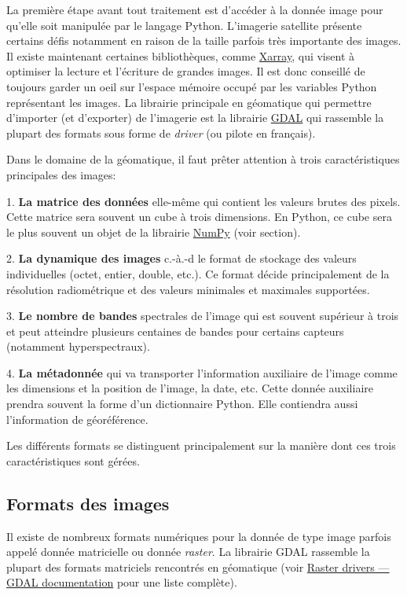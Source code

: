 \documentclass[
  11pt,
  letterpaper,
  open=any,
  twoside=false,
  french]{scrbook}
\begin{document}
La première étape avant tout traitement est d'accéder à la donnée image
pour qu'elle soit manipulée par le langage Python. L'imagerie satellite
présente certains défis notamment en raison de la taille parfois très
importante des images. Il existe maintenant certaines bibliothèques,
comme \href{https://docs.xarray.dev/en/stable/}{Xarray}, qui visent à
optimiser la lecture et l'écriture de grandes images. Il est donc
conseillé de toujours garder un oeil sur l'espace mémoire occupé par les
variables Python représentant les images. La librairie principale en
géomatique qui permettre d'importer (et d'exporter) de l'imagerie est la
librairie \href{https://gdal.org}{GDAL} qui rassemble la plupart des
formats sous forme de \emph{driver} (ou pilote en français).

Dans le domaine de la géomatique, il faut prêter attention à trois
caractéristiques principales des images:

1. \textbf{La matrice des données} elle-même qui contient les valeurs
brutes des pixels. Cette matrice sera souvent un cube à trois
dimensions. En Python, ce cube sera le plus souvent un objet de la
librairie \href{https://numpy.org/}{NumPy} (voir section).

2. \textbf{La dynamique des images} c.-à.-d le format de stockage des
valeurs individuelles (octet, entier, double, etc.). Ce format décide
principalement de la résolution radiométrique et des valeurs minimales
et maximales supportées.

3. \textbf{Le nombre de bandes} spectrales de l'image qui est souvent
supérieur à trois et peut atteindre plusieurs centaines de bandes pour
certains capteurs (notamment hyperspectraux).

4. \textbf{La métadonnée} qui va transporter l'information auxiliaire de
l'image comme les dimensions et la position de l'image, la date, etc.
Cette donnée auxiliaire prendra souvent la forme d'un dictionnaire
Python. Elle contiendra aussi l'information de géoréférence.

Les différents formats se distinguent principalement sur la manière dont
ces trois caractéristiques sont gérées.

\subsection{Formats des images}\label{formats-des-images}

Il existe de nombreux formats numériques pour la donnée de type image
parfois appelé donnée matricielle ou donnée \emph{raster}. La librairie
GDAL rassemble la plupart des formats matriciels rencontrés en
géomatique (voir
\href{https://gdal.org/en/latest/drivers/raster/index.html}{Raster
drivers --- GDAL documentation} pour une liste complète).
\end{document}
